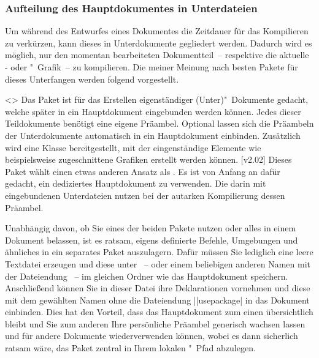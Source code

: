 \subsubsection{Aufteilung des Hauptdokumentes in Unterdateien}
%
Um während des Entwurfes eines Dokumentes die Zeitdauer für das Kompilieren zu 
verkürzen, kann dieses in Unterdokumente gegliedert werden. Dadurch wird es 
möglich, nur den momentan bearbeiteten Dokumentteil~-- respektive die aktuelle 
- oder "~Grafik~-- zu kompilieren. Die meiner 
Meinung nach besten Pakete für dieses Unterfangen werden folgend vorgestellt.
%
\begin{DeclarePackages}
<>
  Das Paket ist für das Erstellen eigenständiger (Unter)"~Dokumente gedacht, 
  welche später in ein Hauptdokument eingebunden werden können. Jedes dieser 
  Teildokumente benötigt eine eigene Präambel. Optional lassen sich die 
  Präambeln der Unterdokumente automatisch in ein Hauptdokument einbinden. 
  Zusätzlich wird eine Klasse bereitgestellt, mit der eingenständige Elemente 
  wie beispielsweise zugeschnittene Grafiken erstellt werden können.
[v2.02]
  Dieses Paket wählt einen etwas anderen Ansatz als . Es 
  ist von Anfang an dafür gedacht, ein dediziertes Hauptdokument zu verwenden. 
  Die darin mit  eingebundenen Unterdateien nutzen bei der 
  autarken Kompilierung dessen Präambel.
\end{DeclarePackages}
%
Unabhängig davon, ob Sie eines der beiden Pakete nutzen oder alles in einem 
Dokument belassen, ist es ratsam, eigens definierte Befehle, Umgebungen und 
ähnliches in ein separates Paket auszulagern. Dafür müssen Sie lediglich eine 
leere Textdatei erzeugen und diese unter ~-- oder einem 
beliebigen anderen Namen mit der Dateiendung ~-- im gleichen Ordner 
wie das Hauptdokument speichern. Anschließend können Sie in dieser Datei ihre 
Deklarationen vornehmen und diese mit dem gewählten Namen ohne die Dateiendung
\Macro||{usepackage|} in das Dokument einbinden. Dies hat 
den Vorteil, dass das Hauptdokument zum einen übersichtlich bleibt und Sie zum 
anderen Ihre persönliche Präambel generisch wachsen lassen und für andere 
Dokumente wiederverwenden können, wobei es dann sicherlich ratsam wäre, das 
Paket zentral in Ihrem lokalen "~Pfad abzulegen. 



